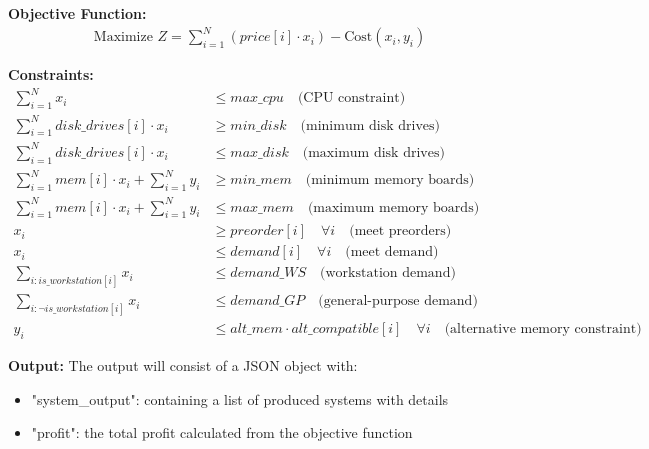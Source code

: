 \documentclass{article}
\begin{document}
\textbf{Objective Function:}
\begin{align}
    \text{Maximize } Z = \sum_{i=1}^{N} (price[i] \cdot x_i) - \text{Cost}(x_i, y_i)
\end{align}

\textbf{Constraints:}
\begin{align}
    \sum_{i=1}^{N} x_i & \leq max\_cpu \quad \text{(CPU constraint)} \\
    \sum_{i=1}^{N} disk\_drives[i] \cdot x_i & \geq min\_disk \quad \text{(minimum disk drives)} \\
    \sum_{i=1}^{N} disk\_drives[i] \cdot x_i & \leq max\_disk \quad \text{(maximum disk drives)} \\
    \sum_{i=1}^{N} mem[i] \cdot x_i + \sum_{i=1}^{N} y_i & \geq min\_mem \quad \text{(minimum memory boards)} \\
    \sum_{i=1}^{N} mem[i] \cdot x_i + \sum_{i=1}^{N} y_i & \leq max\_mem \quad \text{(maximum memory boards)} \\
    x_i & \geq preorder[i] \quad \forall i \quad \text{(meet preorders)} \\
    x_i & \leq demand[i] \quad \forall i \quad \text{(meet demand)} \\
    \sum_{i: is\_workstation[i]} x_i & \leq demand\_WS \quad \text{(workstation demand)} \\
    \sum_{i: \neg is\_workstation[i]} x_i & \leq demand\_GP \quad \text{(general-purpose demand)} \\
    y_i & \leq alt\_mem \cdot alt\_compatible[i] \quad \forall i \quad \text{(alternative memory constraint)}
\end{align}

\textbf{Output:}
The output will consist of a JSON object with:
\begin{itemize}
    \item "system\_output": containing a list of produced systems with details
    \item "profit": the total profit calculated from the objective function
\end{itemize}
\end{document}
